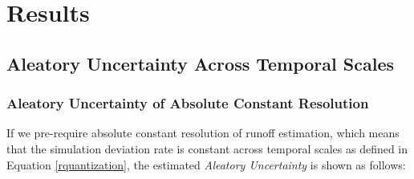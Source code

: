 \documentclass[review]{elsarticle}
\begin{document}
\section{Results}
\subsection{Aleatory Uncertainty Across Temporal Scales} 

\subsubsection{Aleatory Uncertainty of Absolute Constant Resolution}

If we pre-require absolute constant resolution of runoff estimation, which means that the simulation deviation rate is constant across temporal scales as defined in Equation \ref{rquantization}, the estimated \emph{Aleatory Uncertainty} is shown as follows:
\end{document}
